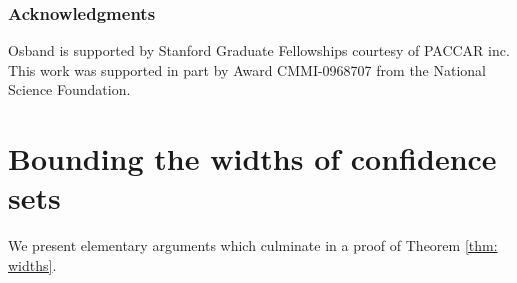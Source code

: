 \documentclass{article}
\begin{document}
\subsubsection*{Acknowledgments}
Osband is supported by Stanford Graduate Fellowships courtesy of PACCAR inc.
This work was supported in part by Award CMMI-0968707 from the National Science Foundation.


\newpage
\small{


}
\newpage




\appendix
\section{Bounding the widths of confidence sets}
\label{sec: widths}
We present elementary arguments which culminate in a proof of Theorem \ref{thm: widths}.
\end{document}

